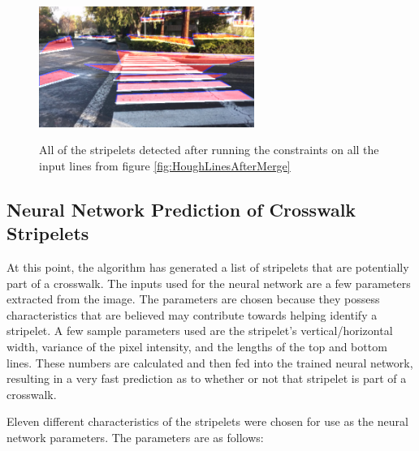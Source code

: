 \documentclass[12pt]{ucthesis}
\newcommand{\captionfonts}{\small\bf\ssp}
\begin{document}
\begin{figure}[H]
\begin{center}
\includegraphics[width=7cm]{UnculledStripelets.png}
\captionfonts
\caption[All detected stripelets]{All of the stripelets detected after running the constraints on all the input lines from figure \ref{fig:HoughLinesAfterMerge}}
\label{fig:UnculledStripelets}
\end{center}
\end{figure}

\subsection{Neural Network Prediction of Crosswalk Stripelets}


At this point, the algorithm has generated a list of stripelets that are potentially part of a crosswalk. The inputs used for the neural network are a few parameters extracted from the image. The parameters are chosen because they possess characteristics that are believed may contribute towards helping identify a stripelet. A few sample parameters used are the stripelet's vertical/horizontal width, variance of the pixel intensity, and the lengths of the top and bottom lines. These numbers are calculated and then fed into the trained neural network, resulting in a very fast prediction as to whether or not that stripelet is part of a crosswalk.


Eleven different characteristics of the stripelets were chosen for use as the neural network parameters. The parameters are as follows:
\end{document}

